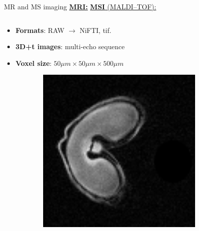 \documentclass[10pt]{beamer}
\begin{document}
\begin{frame}{MR and MS imaging}
  \underline{\textbf{MRI:}} \hspace{0.5\textwidth} \underline{\textbf{MSI} (MALDI--TOF):}
  \begin{columns}
    \begin{column}[t]{.5\textwidth}
      \begin{itemize}
      \item \textbf{Formats}: RAW $\rightarrow$ NiFTI, tif.
      \item \textbf{3D+t images}:  \alert{multi-echo} sequence
      \item \textbf{Voxel size}: $50 \mu m \times 50 \mu m \times 500 \mu m$
      \end{itemize}
      \vspace{1cm}
      \begin{figure}[ht]
        \centering
        \begin{subfigure}[t]{0.33\textwidth}
          \centering \includegraphics[width=0.9\textwidth]{fig/echo2_1}
        \end{subfigure}%
        \begin{subfigure}[t]{0.33\textwidth}

\end{subfigure}
\end{figure}
\end{column}
\end{columns}
\end{frame}
\end{document}
